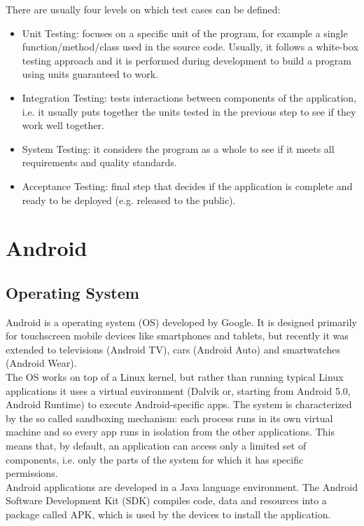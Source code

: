 \documentclass[11pt,a4paper,notitlepage]{article}
\begin{document}
There are usually four levels on which test cases can be defined:
\begin{itemize}
	\item Unit Testing: focuses on a specific unit of the program, for example a single function/method/class used in the source code. Usually, it follows a white-box testing approach and it is performed during development to build a program using units guaranteed to work.
	\item Integration Testing: tests interactions between components of the application, i.e. it usually puts together the units tested in the previous step to see if they work well together.
	\item System Testing: it considers the program as a whole to see if it meets all requirements and quality standards.
	\item Acceptance Testing: final step that decides if the application is complete and ready to be deployed (e.g. released to the public).
\end{itemize}

\section{Android}

\subsection{Operating System}
Android is a operating system (OS) developed by Google. It is designed primarily for touchscreen mobile devices like smartphones and tablets, but recently it was extended to televisions (Android TV), cars (Android Auto) and smartwatches (Android Wear).\medskip \\
The OS works on top of a Linux kernel, but rather than running typical Linux applications it uses a virtual environment (Dalvik or, starting from Android 5.0, Android Runtime) to execute Android-specific apps. The system is characterized by the so called sandboxing mechanism: each process runs in its own virtual machine and so every app runs in isolation from the other applications. This means that, by default, an application can access only a limited set of components, i.e. only the parts of the system for which it has specific permissions.\medskip \\
Android applications are developed in a Java language environment. The Android Software Development Kit (SDK) compiles code, data and resources into a package called APK, which is used by the devices to install the application.
\end{document}
